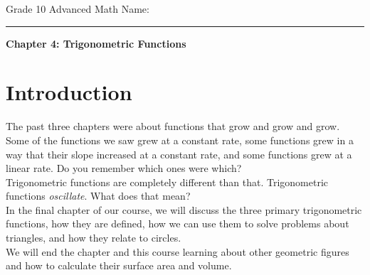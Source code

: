 \documentclass[12pt,fleqn]{book}
\begin{document}
\noindent
\thispagestyle{empty}
Grade 10 Advanced Math \hfill Name: \hspace{2in}
\medskip\hrule
\noindent

\vfill

\begin{center}
	{\bf \huge Chapter 4: Trigonometric Functions}
\end{center}

\vfill
\vfill

\clearpage

\setcounter{page}{1}

\chapter*{Introduction}
The past three chapters were about functions that grow and grow and grow.  Some of the functions we saw grew at a constant rate, some functions grew in a way that their slope increased at a constant rate, and some functions grew at a linear rate.  Do you remember which ones were which?
\\[1em]
Trigonometric functions are completely different than that.  Trigonometric functions \emph{oscillate}.
What does that mean?
\\[1em]
In the final chapter of our course, we will discuss the three primary trigonometric functions, how they are defined, how we can use them to solve problems about triangles, and how they relate to circles.\\
We will end the chapter and this course learning about other geometric figures and how to calculate their surface area and volume.
\\
\end{document}
